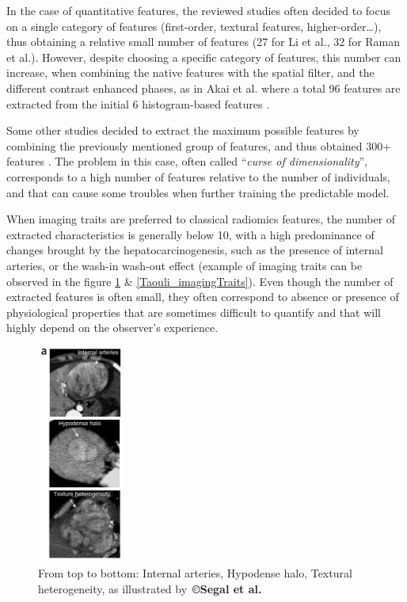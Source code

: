 \documentclass[]{article}
\begin{document}
In the case of quantitative features, the reviewed studies often decided
to focus on a single category of features (first-order, textural
features, higher-order\ldots{}), thus obtaining a relative small number
of features (27 for Li et al., 32 for Raman et al.).
However, despite choosing a specific category of features, this number
can increase, when combining the native features with the spatial
filter, and the different contrast enhanced phases, as in Akai
et al. where a total 96 features are extracted from the initial 6
histogram-based features \cite{Akai2018}.

Some other studies decided to extract the maximum possible features by
combining the previously mentioned group of features, and thus obtained
300+ features \cite{Zhou2017a,Peng2018,Bakr2017}. The problem in this case, often called ``\emph{curse of
dimensionality}'', corresponds to a high number of features relative to
the number of individuals, and that can cause some troubles when further
training the predictable model.

When imaging traits are preferred to classical radiomics features, the
number of extracted characteristics is generally below 10, with a high
predominance of changes brought by the hepatocarcinogenesis, such as the
presence of internal arteries, or the wash-in wash-out effect (example
of imaging traits can be observed in the figure \ref{Segal_imagingTraits} \& \ref{Taouli_imagingTraits}). Even though
the number of extracted features is often small, they often correspond
to absence or presence of physiological properties that are sometimes
difficult to quantify and that will highly depend on the observer's
experience.

\begin{figure}[ht!]
\centering
\includegraphics[width=1.13125in,height=2.82813in]{./images/image3.png}
\caption{From top to bottom: Internal arteries, Hypodense halo, Textural heterogeneity, as illustrated by \textbf{©Segal et al.} \cite{Segal2007}}
\label{Segal_imagingTraits}
\end{figure}
\end{document}
